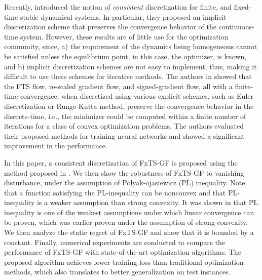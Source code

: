 \documentclass[letterpaper]{article}
\begin{document}
Recently, \cite{polyakov2019consistent} introduced the notion of \textit{consistent} discretization for finite, and fixed-time stable dynamical systems. In particular, they proposed an implicit discretization scheme that preserves the convergence behavior of the continuous-time system. However, these results are of little use for the optimization community, since, a) the requirement of the dynamics being homogeneous cannot be satisfied unless the equilibrium point, in this case, the optimizer, is known, and b) implicit discretization schemes are not easy to implement, thus, making it difficult to use these schemes for iterative methods. The authors in \cite{benosman2020optimizing} showed that the FTS flow, re-scaled gradient flow, and signed-gradient flow, all with a finite-time convergence, when discretized using various explicit schemes, such as Euler discretization or Runge-Kutta method, preserve the convergence behavior in the discrete-time, i.e., the minimizer could be computed within a finite number of iterations for a class of convex optimization problems. The authors evaluated their proposed methods for training neural networks and showed a significant improvement in the performance.%

In this paper, a consistent discretization of FxTS-GF is proposed using the method proposed in \cite{garg2021MVIP}. We then show the robustness of FxTS-GF to vanishing disturbance, under the assumption of Polyak-ojasiewicz (PL) inequality. Note that a function satisfying the PL-inequality can be nonconvex and that PL-inequality is a weaker assumption than strong convexity. It was shown in \cite{karimi2016linear} that PL inequality is one of the weakest assumptions under which linear convergence can be proven, which was earlier proven under the assumption of strong convexity. We then analyze the static regret of FxTS-GF and show that it is bounded by a constant. Finally, numerical experiments are conducted to compare the performance of FxTS-GF with state-of-the-art optimization algorithms. The proposed algorithm achieves lower training loss than traditional optimization methods, which also translates to better generalization on test instances.

\end{document}
